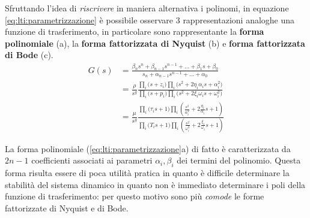 		\begin{concetto}
			Sfruttando l'idea di \textit{riscrivere} in maniera alternativa i polinomi, in equazione \ref{eq:lti:parametrizzazione} è possibile osservare 3 rappresentazioni analoghe una funzione di trasferimento, in particolare sono rappresentante la \textbf{forma polinomiale} (a), la \textbf{forma fattorizzata di Nyquist} (b) e \textbf{forma fattorizzata di Bode} (c).
			\begin{subequations} \label{eq:lti:parametrizzazione}
			\begin{align}
				G(s) & = \frac{\beta_ns^n + \beta_{n-1}s^{n-1} + \dots + \beta_1 s + \beta_0}{s_n + \alpha_{n-1}s^{n-1}+ \dots + \alpha_0} \\
				& = \frac{\rho}{s^g} \frac{ \prod_i \big(s + z_i\big) \prod_i \big( s^2 + 2\eta_i\alpha_i s+ \alpha_i^2 \big) }{ \prod_i \big(s + p_i\big) \prod_i \big( s^2 + 2\xi_i\omega_i s+ \omega_i^2 \big) } \\
				& = \frac{\mu}{s^g} \frac{ \prod_i \big(\tau_is + 1\big) \prod_i \left( \frac{s^2}{\alpha_i^2} + 2 \frac{\eta_i}{\alpha_i} s + 1  \right) } { \prod_i \big(T_is + 1\big) \prod_i \left( \frac{s^2}{\omega_i^2} + 2 \frac{\xi_i}{\omega_i} s + 1  \right) }
			\end{align}
			\end{subequations}
		\end{concetto}
	
		La forma polinomiale (\ref{eq:lti:parametrizzazione}a) di fatto è caratterizzata da $2n-1$ coefficienti associati ai parametri $\alpha_i,\beta_i$ dei termini del polinomio. Questa forma risulta essere di poca utilità pratica in quanto è difficile determinare la stabilità del sistema dinamico in quanto non è immediato determinare i poli della funzione di trasferimento: per questo motivo sono più \textit{comode} le forme fattorizzate di Nyquist e di Bode.
		
